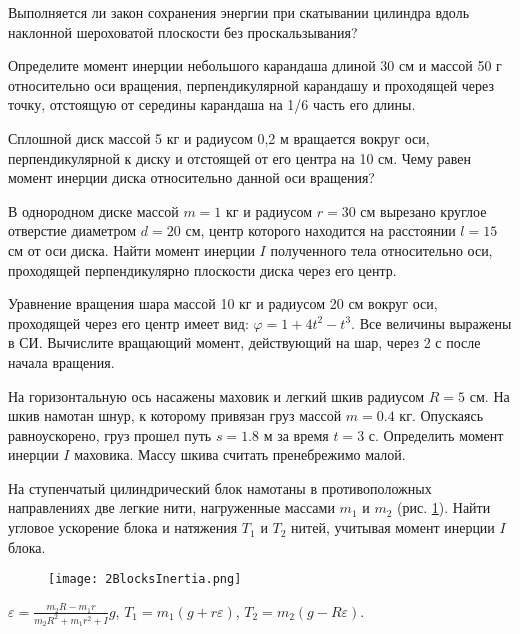 \begin{ex}
Выполняется ли закон сохранения энергии при скатывании цилиндра вдоль наклонной шероховатой плоскости без проскальзывания?
\end{ex}	


\simpleProblems

\begin{ex}
Определите момент инерции небольшого карандаша длиной 30 см и массой 50 г относительно оси вращения, перпендикулярной карандашу и проходящей через точку, отстоящую от середины карандаша на 1/6 часть его длины.
\end{ex}	

\begin{ex}
Сплошной диск массой 5 кг и радиусом 0,2 м вращается вокруг оси, перпендикулярной к диску и отстоящей от его центра на 10 см. Чему равен момент инерции диска относительно данной оси вращения?
\end{ex}	

\begin{ex}
В однородном диске массой $m = 1$ кг и радиусом $r = 30$ см вырезано круглое отверстие диаметром $d = 20$ см, центр которого находится на расстоянии $l = 15$ см от оси диска. Найти момент инерции $I$ полученного тела относительно оси, проходящей перпендикулярно плоскости диска через его центр.
\end{ex}	

\begin{ex}
Уравнение вращения шара массой 10 кг и радиусом 20 см вокруг оси, проходящей через его центр имеет вид: $\varphi = 1 + 4t^2 - t^3$. Все величины выражены в СИ. Вычислите вращающий момент, действующий на шар, через 2 с после начала вращения.
\end{ex}	

\begin{ex}
На горизонтальную ось насажены маховик и легкий шкив радиусом $R = 5$ см. На шкив намотан шнур, к которому привязан груз массой $m = 0.4$ кг. Опускаясь равноускорено, груз прошел путь $s = 1.8$ м за время $t = 3$ с. Определить момент инерции $I$ маховика. Массу шкива считать пренебрежимо малой.
\end{ex}	

\complexProblems

\begin{ex} %
На ступенчатый цилиндрический блок намотаны в противоположных направлениях две легкие нити, нагруженные массами $m_1$ и $m_2$ (рис. \ref{2BlocksInertia}). Найти угловое ускорение блока и натяжения $T_1$ и $T_2$ нитей, учитывая момент инерции $I$ блока.

\begin{figure}[h]
\centering
\texttt{[image: 2BlocksInertia.png]}
\caption{}
\label{2BlocksInertia}
\end{figure}

\begin{ans}
$\varepsilon = \frac{m_2R - m_1r}{m_2R^2 + m_1r^2 + I}g$, $T_1 = m_1(g+r\varepsilon)$, $T_2 = m_2(g-R\varepsilon)$.
\end{ans}
\end{ex}	

